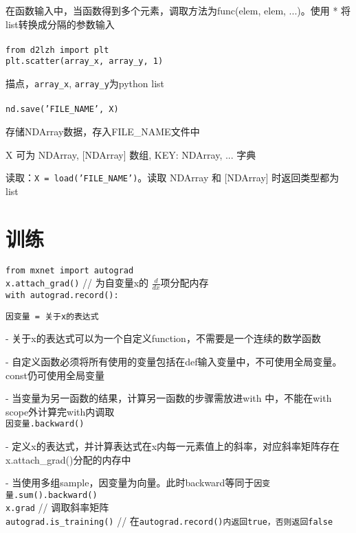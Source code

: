 \documentclass[UTF8]{ctexart}
\begin{document}
  在函数输入中，当函数得到多个元素，调取方法为func(elem, elem, ...)。使用 * 将list转换成分隔的参数输入\\\\
\texttt{from d2lzh import plt}\\
\texttt{plt.scatter(array\_x, array\_y, 1)}

  描点，\texttt{array\_x}, \texttt{array\_y}为python list\\\\
\texttt{nd.save('FILE\_NAME', X)}

  存储NDArray数据，存入FILE\_NAME文件中

  X 可为 NDArray, [NDArray] 数组, {KEY: NDArray, ...} 字典
  
  读取：\texttt{X = load('FILE\_NAME')}。读取 NDArray 和 [NDArray] 时返回类型都为list

\section{训练}

\noindent \texttt{from mxnet import autograd}\\
\texttt{x.attach\_grad()} // 为自变量x的 $\frac{d }{d x} $项分配内存\\
\texttt{with autograd.record():}

  \texttt{因变量 = 关于x的表达式}
  
  - 关于x的表达式可以为一个自定义function，不需要是一个连续的数学函数
  
  - 自定义函数必须将所有使用的变量包括在def输入变量中，不可使用全局变量。const仍可使用全局变量
  
  - 当变量为另一函数的结果，计算另一函数的步骤需放进with 中，不能在with scope外计算完with内调取\\
\texttt{因变量.backward()}
  
  - 定义x的表达式，并计算表达式在x内每一元素值上的斜率，对应斜率矩阵存在x.attach\_grad()分配的内存中
  
  - 当使用多组sample，因变量为向量。此时backward等同于\texttt{因变量.sum().backward()}\\
\texttt{x.grad} // 调取斜率矩阵\\
\texttt{autograd.is\_training()} // 在\texttt{autograd.record()内返回true，否则返回false}

\end{document}
